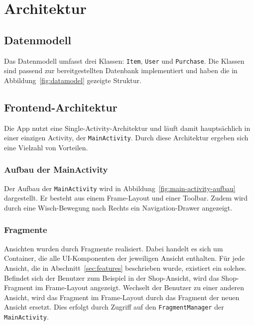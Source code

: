 \section{Architektur}\label{sec:architecture}

\subsection{Datenmodell}\label{subsec:datamodel}

Das Datenmodell umfasst drei Klassen: \texttt{Item}, \texttt{User} und \texttt{Purchase}.
Die Klassen sind passend zur bereitgestellten Datenbank implementiert und haben die in Abbildung~\ref{fig:datamodel} gezeigte Struktur.


\subsection{Frontend-Architektur}\label{subsec:frontend}

Die App nutzt eine Single-Activity-Architektur und läuft damit hauptsächlich in einer einzigen Activity, der \texttt{MainActivity}.
Durch diese Architektur ergeben sich eine Vielzahl von Vorteilen.

\subsubsection{Aufbau der MainActivity}

Der Aufbau der \texttt{MainActivity} wird in Abbildung~\ref{fig:main-activity-aufbau} dargestellt.
Er besteht aus einem Frame-Layout und einer Toolbar.
Zudem wird durch eine Wisch-Bewegung nach Rechts ein Navigation-Drawer angezeigt.

\subsubsection{Fragmente}

Ansichten wurden durch Fragmente realisiert.
Dabei handelt es sich um Container, die alle UI-Komponenten der jeweiligen Ansicht enthalten.
Für jede Ansicht, die in Abschnitt~\ref{sec:features} beschrieben wurde, existiert ein solches.
Befindet sich der Benutzer zum Beispiel in der Shop-Ansicht, wird das Shop-Fragment im Frame-Layout angezeigt.
Wechselt der Benutzer zu einer anderen Ansicht, wird das Fragment im Frame-Layout durch das Fragment der neuen Ansicht ersetzt.
Dies erfolgt durch Zugriff auf den \texttt{FragmentManager} der \texttt{MainActivity}.

